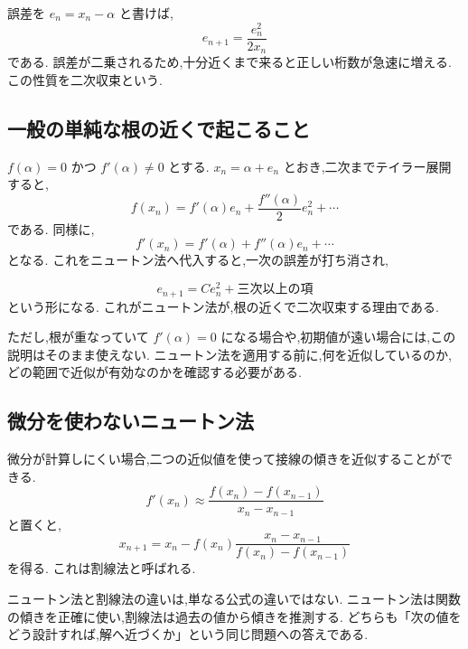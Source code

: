 誤差を $e_n=x_n-\alpha$ と書けば,
\[
  e_{n+1}=\frac{e_n^2}{2x_n}
\]
である.
誤差が二乗されるため,十分近くまで来ると正しい桁数が急速に増える.
この性質を二次収束という.

\subsection{一般の単純な根の近くで起こること}

$f(\alpha)=0$ かつ $f'(\alpha)\neq0$ とする.
$x_n=\alpha+e_n$ とおき,二次までテイラー展開すると,
\[
  f(x_n)=f'(\alpha)e_n+\frac{f''(\alpha)}2e_n^2+\cdots
\]
である.
同様に,
\[
  f'(x_n)=f'(\alpha)+f''(\alpha)e_n+\cdots
\]
となる.
これをニュートン法へ代入すると,一次の誤差が打ち消され,

\[
  e_{n+1}=C e_n^2+\text{三次以上の項}
\]
という形になる.
これがニュートン法が,根の近くで二次収束する理由である.

ただし,根が重なっていて $f'(\alpha)=0$ になる場合や,初期値が遠い場合には,この説明はそのまま使えない.
ニュートン法を適用する前に,何を近似しているのか,どの範囲で近似が有効なのかを確認する必要がある.

\subsection{微分を使わないニュートン法}

微分が計算しにくい場合,二つの近似値を使って接線の傾きを近似することができる.
\[
  f'(x_n)\approx
  \frac{f(x_n)-f(x_{n-1})}{x_n-x_{n-1}}
\]
と置くと,
\[
  x_{n+1}
  =
  x_n
  -
  f(x_n)
  \frac{x_n-x_{n-1}}{f(x_n)-f(x_{n-1})}
\]
を得る.
これは割線法と呼ばれる.

ニュートン法と割線法の違いは,単なる公式の違いではない.
ニュートン法は関数の傾きを正確に使い,割線法は過去の値から傾きを推測する.
どちらも「次の値をどう設計すれば,解へ近づくか」という同じ問題への答えである.
